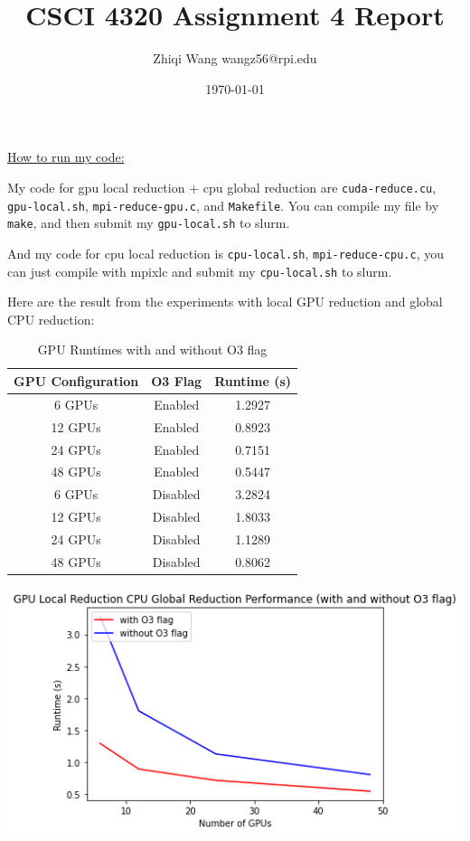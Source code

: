 \documentclass{article}
\begin{document}
\title{\vspace{-3cm}CSCI 4320 Assignment 4 Report}
\author{Zhiqi Wang wangz56@rpi.edu}
\date{\today}
\maketitle

\underline{How to run my code: }

My code for gpu local reduction + cpu global reduction are \texttt{cuda-reduce.cu}, \texttt{gpu-local.sh}, \texttt{mpi-reduce-gpu.c}, and \texttt{Makefile}. You can compile my file by \texttt{make}, and then submit my \texttt{gpu-local.sh} to slurm.

And my code for cpu local reduction is \texttt{cpu-local.sh}, \texttt{mpi-reduce-cpu.c}, you can just compile with mpixlc and submit my \texttt{cpu-local.sh} to slurm.

Here are the result from the experiments with local GPU reduction and global CPU reduction:

\begin{table}[h!]
  \centering
  \begin{tabular}{|c|c|c|}
  \hline
  \textbf{GPU Configuration} & \textbf{O3 Flag} & \textbf{Runtime (s)} \\ \hline
  6 GPUs & Enabled & 1.2927 \\ \hline
  12 GPUs & Enabled & 0.8923 \\ \hline
  24 GPUs & Enabled & 0.7151 \\ \hline
  48 GPUs & Enabled & 0.5447 \\ \hline
  6 GPUs & Disabled & 3.2824 \\ \hline
  12 GPUs & Disabled & 1.8033 \\ \hline
  24 GPUs & Disabled & 1.1289 \\ \hline
  48 GPUs & Disabled & 0.8062 \\ \hline
  \end{tabular}
  \caption{GPU Runtimes with and without O3 flag}
  \end{table}
  
  \includegraphics[width=\textwidth]{gpu_local.png}
  
\end{document}
